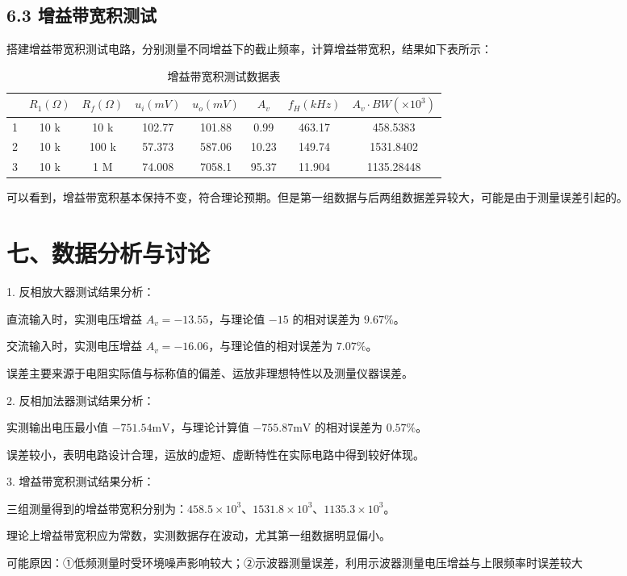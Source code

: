 \documentclass[12pt,a4paper]{article}
\begin{document}
\subsection*{6.3 增益带宽积测试}
搭建增益带宽积测试电路，分别测量不同增益下的截止频率，计算增益带宽积，结果如下表所示：
\begin{table}[H]
    \centering
    \begin{tabular}{|c|c|c|c|c|c|c|c|}
\hline & $R_{1}(\Omega)$ & $R_{f}(\Omega)$ & $u_{i}(mV)$ & $u_{o}(mV)$ & $A_{v}$ & $f_{H}(kHz)$ & $A_{v} \cdot B W\left(\times 10^{3}\right)$ \\
\hline 1 & 10  k & 10  k & 102.77 & 101.88 & 0.99 &463.17 & 458.5383 \\
\hline 2 & 10  k & 100 k  & 57.373 & 587.06 & 10.23 & 149.74 & 1531.8402 \\
\hline 3 & 10  k & 1 M  & 74.008 & 7058.1 & 95.37 & 11.904 & 1135.28448 \\
\hline
\end{tabular}
    \caption{增益带宽积测试数据表}
    \label{tab:GBW}
\end{table}
可以看到，增益带宽积基本保持不变，符合理论预期。但是第一组数据与后两组数据差异较大，可能是由于测量误差引起的。
\section*{七、数据分析与讨论}

1. 反相放大器测试结果分析：

   直流输入时，实测电压增益 $A_v = -13.55$，与理论值 $-15$ 的相对误差为 $9.67\%$。

   交流输入时，实测电压增益 $A_v = -16.06$，与理论值的相对误差为 $7.07\%$。

   误差主要来源于电阻实际值与标称值的偏差、运放非理想特性以及测量仪器误差。

2. 反相加法器测试结果分析：

   实测输出电压最小值 $-751.54\text{mV}$，与理论计算值 $-755.87\text{mV}$ 的相对误差为 $0.57\%$。

   误差较小，表明电路设计合理，运放的虚短、虚断特性在实际电路中得到较好体现。

3. 增益带宽积测试结果分析：

   三组测量得到的增益带宽积分别为：$458.5\times10^3$、$1531.8\times10^3$、$1135.3\times10^3$。

   理论上增益带宽积应为常数，实测数据存在波动，尤其第一组数据明显偏小。

   可能原因：①低频测量时受环境噪声影响较大；②示波器测量误差，利用示波器测量电压增益与上限频率时误差较大
\end{document}

